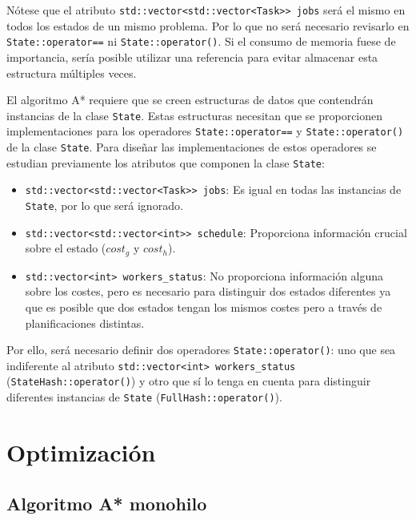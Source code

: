 \begin{notebox}
    Nótese que el atributo \lstinline{std::vector<std::vector<Task>> jobs} será el mismo
    en todos los estados de un mismo problema.
    Por lo que no será necesario revisarlo en
    \lstinline{State::operator==} ni \lstinline{State::operator()}.
    Si el consumo de memoria fuese de importancia,
    sería posible utilizar una referencia para evitar
    almacenar esta estructura múltiples veces.
\end{notebox}

El algoritmo A* requiere que se creen estructuras de datos que contendrán instancias
de la clase \lstinline{State}.
Estas estructuras necesitan que se proporcionen implementaciones para los operadores
\lstinline{State::operator==} y \lstinline{State::operator()} de la clase \lstinline{State}.
Para diseñar las implementaciones de estos operadores
se estudian previamente los atributos que componen la clase \lstinline{State}:

\begin{itemize}[itemsep=0.25px]
    \item \lstinline{std::vector<std::vector<Task>> jobs}: Es igual en todas las
    instancias de \lstinline{State}, por lo que será ignorado.
    \item \lstinline{std::vector<std::vector<int>> schedule}: Proporciona
    información crucial sobre el estado ($cost_g$ y $cost_h$).
    \item \lstinline{std::vector<int> workers_status}: No proporciona
    información alguna sobre los costes,
    pero es necesario para distinguir dos estados diferentes
    ya que es posible que dos estados tengan los mismos costes pero a través de
    planificaciones distintas.
\end{itemize}

Por ello, será necesario definir dos operadores \lstinline{State::operator()}:
uno que sea indiferente al atributo \lstinline{std::vector<int> workers_status}
(\lstinline{StateHash::operator()})
y otro que sí lo tenga en cuenta para distinguir diferentes instancias de \lstinline{State}
(\lstinline{FullHash::operator()}).

\pagebreak
\section{Optimización}

\subsection{Algoritmo A* monohilo}

